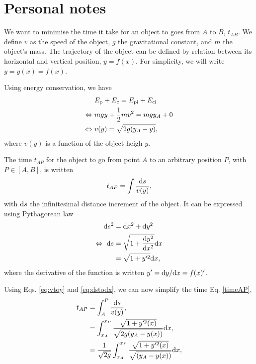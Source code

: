 \documentclass{article}
\begin{document}
\section*{Personal notes}

We want to minimise the time it take for an object to goes from $A$ to $B$, $t_{AB}$. We define $v$ as the speed of the object, $g$ the gravitational constant, and $m$ the object's mass. The trajectory of the object can be defined by relation between its horizontal and vertical position, $y = f(x)$. For simplicity, we will write $y = y(x) = f(x)$.

Using energy conservation, we have
\begin{align}
  &E_{\text p} + E_{\text c} = E_{\text{pi}} + E_{\text{ci}}\nonumber\\
\Leftrightarrow~ & mgy + \frac 12 m v^2 = mgy_A + 0\nonumber\\
\Leftrightarrow~& v(y) = \sqrt{2 g(y_A - y)}, \label{eq:vtoy}
\end{align}
where $v(y)$ is a function of the object heigh $y$.

The time $t_{AP}$ for the object to go from point $A$ to an arbitrary position $P$, with $P\in[A, B]$, is written
\begin{align}
t_{AP} = \int \frac{\text d s }{v(y)}, \label{timeAP}
\end{align}
with $\text d s $ the infinitesimal distance increment of the object. It can be expressed using Pythagorean law
\begin{align}
\text d s^2  &= \text d x^2 + \text d y^2 \nonumber\\
\Leftrightarrow~ \text d s &= \sqrt{1 + \frac{\text d y^2}{\text d x^2}}\text d x\nonumber\\
 & = \sqrt{1 + y'^2}\text d x,\label{eq:dstodx}
\end{align}
where the derivative of the function is written $y' = \text d y/\text d x = f(x)'$.

Using Eqs. \eqref{eq:vtoy} and \eqref{eq:dstodx}, we can now simplify the time Eq. \eqref{timeAP},
\begin{align}
t_{AP} &= \int_A^P \frac{\text d s }{v(y)},\nonumber\\
&= \int_{x_A}^{x_P} \frac{\sqrt{1 + y'^2(x)}}{\sqrt{2 g(y_A - y(x))}} \text d x,\nonumber\\
&= \frac 1{\sqrt{2 g}} \int_{x_A}^{x_P} \frac{\sqrt{1 + y'^2(x)}}{\sqrt{(y_A - y(x))}} \text d x, \label{eq:tAP}
\end{align}
\end{document}
